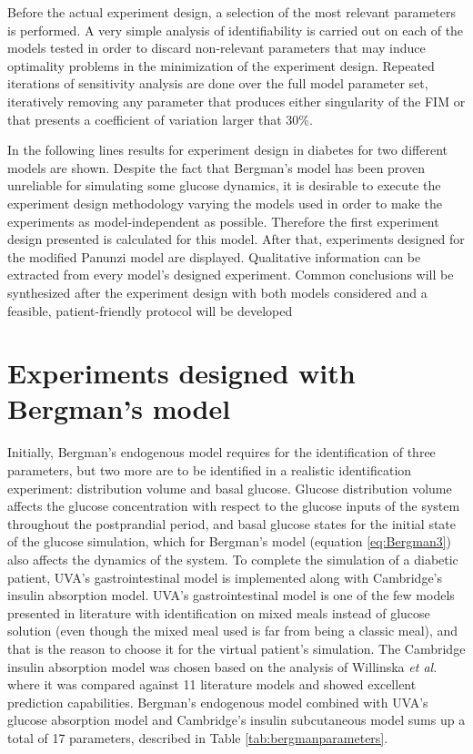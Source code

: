 Before the actual experiment design, a selection of the most relevant parameters is performed. A very simple analysis of identifiability is carried out on each of the models tested in order to discard non-relevant parameters that may induce optimality problems in the minimization of the experiment design. Repeated iterations of sensitivity analysis are done over the full model parameter set, iteratively removing any parameter that produces either singularity of the FIM or that presents a coefficient of variation larger that 30\%.

In the following lines results for experiment design in diabetes for two different models are shown. Despite the fact that Bergman's model has been proven unreliable for simulating some glucose dynamics, it is desirable to execute the experiment design methodology varying the models used in order to make the experiments as model-independent as possible. Therefore the first experiment design presented is calculated for this model. After that, experiments designed for the modified Panunzi model are displayed. Qualitative information can be extracted from every model's designed experiment. Common conclusions will be synthesized after the experiment design with both models considered and a feasible, patient-friendly protocol will be developed

\section{Experiments designed with Bergman's model}
\label{sec:ExperimentsDesignedWithBergmanSModel}

Initially, Bergman's endogenous model requires for the identification of three parameters, but two more are to be identified in a realistic identification experiment: distribution volume and basal glucose. Glucose distribution volume affects the glucose concentration with respect to the glucose inputs of the system throughout the postprandial period, and basal glucose states for the initial state of the glucose simulation, which for Bergman's model (equation \eqref{eq:Bergman3}) also affects the dynamics of the system. To complete the simulation of a diabetic patient, UVA's gastrointestinal model is implemented along with Cambridge's insulin absorption model. UVA's gastrointestinal model is one of the few models presented in literature with identification on mixed meals instead of glucose solution (even though the mixed meal used is far from being a classic meal), and that is the reason to choose it for the virtual patient's simulation. The Cambridge insulin absorption model was chosen based on the analysis of Willinska \textit{et al.} where it was compared against 11 literature models \cite{wilinska2005insulin} and showed excellent prediction capabilities. Bergman's endogenous model combined with UVA's glucose absorption model and Cambridge's insulin subcutaneous model sums up a total of 17 parameters, described in Table \ref{tab:bergmanparameters}.

